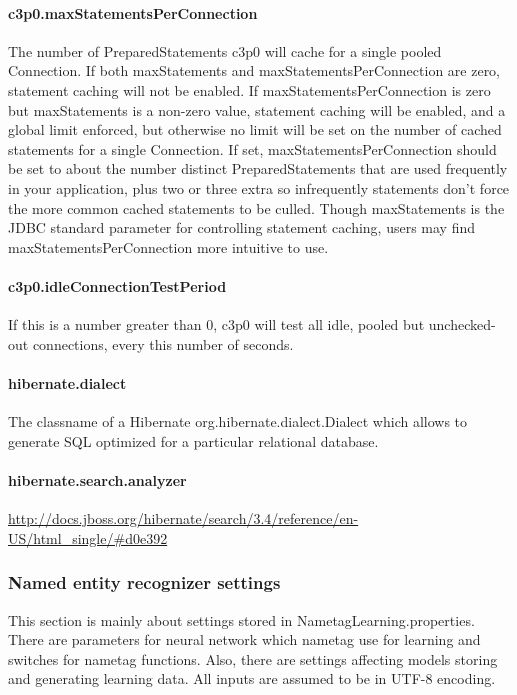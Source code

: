\paragraph{c3p0.maxStatementsPerConnection}
The number of PreparedStatements c3p0 will cache for a single pooled Connection.
If both maxStatements and maxStatementsPerConnection are zero, statement caching
will not be enabled. If maxStatementsPerConnection is zero but maxStatements is
a non-zero value, statement caching will be enabled, and a global limit enforced,
but otherwise no limit will be set on the number of cached statements for a single
Connection. If set, maxStatementsPerConnection should be set to about the number
distinct PreparedStatements that are used frequently in your application, plus
two or three extra so infrequently statements don't force the more common cached
statements to be culled. Though maxStatements is the JDBC standard parameter for
controlling statement caching, users may find maxStatementsPerConnection more
intuitive to use.

\paragraph{c3p0.idleConnectionTestPeriod}
If this is a number greater than 0, c3p0 will test all idle, pooled but unchecked-out
connections, every this number of seconds.

\paragraph{hibernate.dialect}
The classname of a Hibernate org.hibernate.dialect.Dialect which allows to generate
SQL optimized for a particular relational database.

\paragraph{hibernate.search.analyzer}
\url{http://docs.jboss.org/hibernate/search/3.4/reference/en-US/html_single/#d0e392}

\subsubsection{Named entity recognizer settings}
\label{sssec:NametagSettings}
This section is mainly about settings stored in NametagLearning.properties. There
are parameters for neural network which nametag use for learning and switches for
nametag functions. Also, there are settings affecting models storing and
generating learning data. All inputs are assumed to be in UTF-8 encoding.

